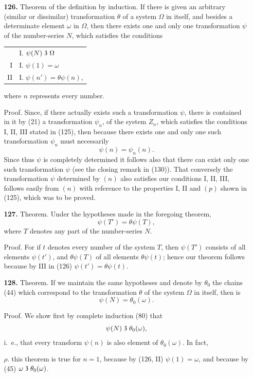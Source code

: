 \documentclass[oneside]{book}
\newcommand\partof{\mathrel{\raisebox{0.45ex}{$\mathfrak{3}$}}}   %
\newcommand\mypara{\medskip\textbf}
\begin{document}
\mypara{126.} Theorem of the definition by induction. If
there is given an arbitrary (similar or dissimilar) transformation
$\theta$ of a system $\Omega$ in itself, and besides a determinate
element $\omega$ in $\Omega$, then there exists one and
only one transformation $\psi$ of the number-series $N$,
which satisfies the conditions
\par\begin{tabular}[b]{@{}r@{}l@{}}
 &I\@. $\psi(N) \partof \Omega$\\
I&I\@. $\psi(1)=\omega$\\
II&I\@. $\psi(n') = \theta\psi(n)$,
\end{tabular}
where $n$ represents every number.

Proof. Since, if there actually exists such a transformation
$\psi$, there is contained in it by (21) a transformation
$\psi_n$, of the system $Z_n$, which satisfies the conditions
I, II, III stated in (125), then because there
exists one and only one such transformation $\psi_n$ must
necessarily
\[
\psi(n) =\psi_n(n). \tag{$n$}
\]
Since thus $\psi$ is completely determined it follows also
that there can exist only one such transformation $\psi$
(see the closing remark in (130)). That conversely
the transformation $\psi$ determined by $(n)$ also satisfies
our conditions I, II, III, follows easily from $(n)$ with
reference to the properties I, II and $(p)$ shown in (125),
which was to be proved.

\mypara{127.} Theorem. Under the hypotheses made in the
foregoing theorem,
\[
\psi(T') = \theta\psi(T),
\]
where $T$ denotes any part of the number-series $N$.

Proof. For if $t$ denotes every number of the system
$T$, then $\psi(T')$ consists of all elements $\psi(t')$, and
$\theta\psi(T)$ of all elements $\theta\psi(t)$; hence our theorem follows
because by III in (126) $\psi(t') = \theta\psi(t)$.

\mypara{128.} Theorem. If we maintain the same hypotheses
and denote by $\theta_{0}$ the chains (44) which correspond
to the transformation $\theta$ of the system $\Omega$ in itself,
then is
\[
\psi(N) = \theta_0(\omega).
\]


Proof.  We show first by complete induction (80)
that
\[
\psi(N) \partof \theta_0(\omega),
\]
i.~e., that every transform $\psi(n)$ is also element of
$\theta_0(\omega)$. In fact,

$\rho$. this theorem is true for $n = 1$, because by (126,
II) $\psi(1)=\omega$, and because by (45) $\omega \partof \theta_0(\omega)$.
\end{document}
